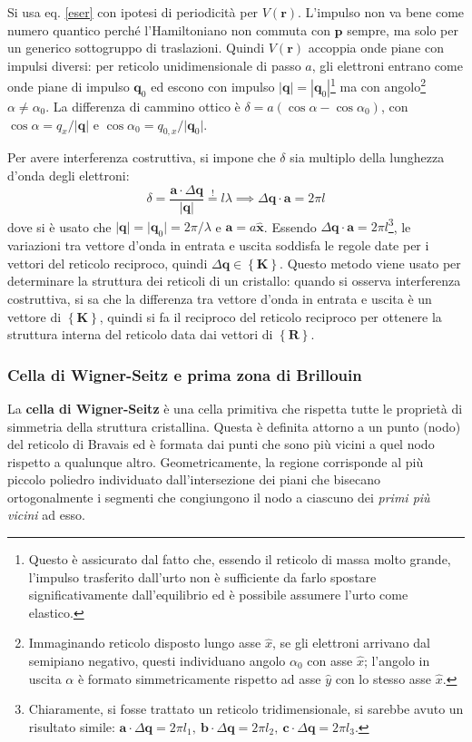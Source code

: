 \documentclass[10pt, a4paper]{scrartcl}
\numberwithin{equation}{subsection}
\theoremstyle{style1}
\theoremstyle{style2}
\begin{document}
Si usa eq. \ref{eser} con ipotesi di periodicit\`a per $V(\mathbf{r} )$. 
L'impulso non va bene come numero quantico perch\'e l'Hamiltoniano non commuta con $\mathbf{p} $ sempre, ma solo per un generico sottogruppo di traslazioni. 
Quindi $V(\mathbf{r} )$ accoppia onde piane con impulsi diversi: per reticolo unidimensionale di passo $a$, gli elettroni entrano come onde piane di impulso $\mathbf{q} _0$ ed escono con impulso $|\mathbf{q} | = | \mathbf{q} _0|$\footnote{Questo \`e assicurato dal fatto che, essendo il reticolo di massa molto grande, l'impulso trasferito dall'urto non \`e sufficiente da farlo spostare significativamente dall'equilibrio ed \`e possibile assumere l'urto come elastico.} ma con angolo\footnote{Immaginando reticolo disposto lungo asse $\hat{x}$, se gli elettroni arrivano dal semipiano negativo, questi individuano angolo $\alpha_0$ con asse $\hat{x}$; l'angolo in uscita $\alpha $ \`e formato simmetricamente rispetto ad asse $\hat{y}$ con lo stesso asse $\hat{x}$.} $\alpha \neq \alpha _0$. 
La differenza di cammino ottico \`e $\delta = a(\cos \alpha - \cos \alpha _0)$, con $\cos \alpha  = q_x / \lvert \mathbf{q}  \rvert $ e $\cos \alpha _0 = q_{0,x} / \lvert \mathbf{q} _0 \rvert $.

Per avere interferenza costruttiva, si impone che $\delta $ sia multiplo della lunghezza d'onda degli elettroni:
\[
	\delta = \frac{\mathbf{a} \cdot  \Delta \mathbf{q} }{\lvert \mathbf{q}  \rvert } \stackrel{!}{=} l \lambda  \implies \Delta \mathbf{q} \cdot \mathbf{a}  = 2\pi l  
\] 
dove si \`e usato che $\lvert \mathbf{q}  \rvert = \lvert \mathbf{q} _0 \rvert = 2\pi /\lambda $ e $\mathbf{a } = a \hat{\mathbf{x} }$.
Essendo $\Delta \mathbf{q} \cdot \mathbf{a}  = 2\pi l$\footnote{Chiaramente, si fosse trattato un reticolo tridimensionale, si sarebbe avuto un risultato simile: $\mathbf{a } \cdot  \Delta \mathbf{q} = 2\pi l_1, \ \mathbf{b} \cdot  \Delta \mathbf{q} = 2\pi l_2, \ \mathbf{c} \cdot \Delta \mathbf{q} = 2\pi l_3$.}, le variazioni tra vettore d'onda in entrata e uscita soddisfa le regole date per i vettori del reticolo reciproco, quindi $\Delta \mathbf{q} \in \left\{ \mathbf{K}  \right\} $.
Questo metodo viene usato per determinare la struttura dei reticoli di un cristallo: quando si osserva interferenza costruttiva, si sa che la differenza tra vettore d'onda in entrata e uscita \`e un vettore di $\left\{ \mathbf{K}  \right\} $, quindi si fa il reciproco del reticolo reciproco per ottenere la struttura interna del reticolo data dai vettori di $\left\{ \mathbf{R}  \right\} $.
\subsubsection{Cella di Wigner-Seitz e prima zona di Brillouin}
La \textbf{cella di Wigner-Seitz} \`e una cella primitiva che rispetta tutte le propriet\`a di simmetria della struttura cristallina. Questa \`e definita attorno a un punto (nodo) del reticolo di Bravais ed \`e formata dai punti che sono pi\`u vicini a quel nodo rispetto a qualunque altro. Geometricamente, la regione corrisponde al pi\`u piccolo poliedro individuato dall'intersezione dei piani che bisecano ortogonalmente i segmenti che congiungono il nodo a ciascuno dei \textit{primi pi\`u vicini} ad esso.
\end{document}
